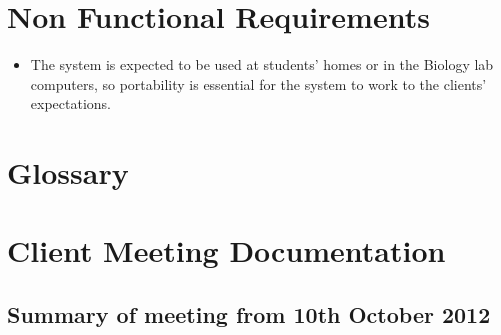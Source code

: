 \documentclass{l3deliverable}
\begin{document}

\section{Non Functional Requirements}


\begin{itemize}
\item{
The system is expected to be used at students' homes or in the Biology
lab computers, so portability is essential for the system to work to
the clients' expectations.
}
\end{itemize}


\appendix

\section{Glossary}



\section{Client Meeting Documentation}
\label{sec:clientMeetingDocs}


\subsection{Summary of meeting from 10th October 2012}


\end{document}
